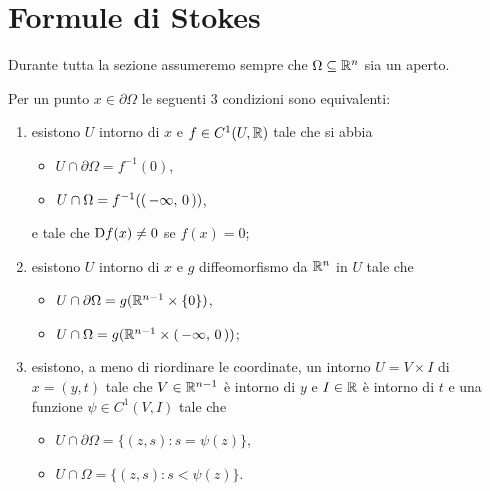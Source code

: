 \section{Formule di Stokes}\label{sezione:FormuleStokes}

Durante tutta la sezione assumeremo sempre che $\Omega\subseteq\mathbb R^n$ sia un aperto.

\begin{theorem}\label{thm:PtRegEquiv}
	Per un punto $x\in \partial \Omega$ le seguenti $3$ condizioni sono equivalenti:
	\begin{enumerate}
		\item esistono $U$ intorno di $x$ e $f\in C^1(U,\mathbb R)$ tale che si abbia
			\begin{itemize}
				\item $U\cap \partial \Omega=f^{-1}(0)$,
				\item $U\cap \Omega=f^{-1}(\left(\,-\infty,\,0\,\right))$,
			\end{itemize}
			e tale che $\mathrm D f(x)\neq 0$ se $f(x)=0$;\label{PRE:i}
		\item esistono $U$ intorno di $x$ e $g$ diffeomorfismo da $\mathbb R^n$ in $U$ tale che\label{PRE:ii}
			\begin{itemize}
				\item $U\cap \partial \Omega = g(\mathbb R^{n-1}\times\{0\})$,
				\item $U\cap \Omega = g(\mathbb R^{n-1}\times\left(\,-\infty,\,0\,\right))$;
			\end{itemize}
		\item esistono, a meno di riordinare le coordinate, un intorno $U=V\times I$ di $x=(y,t)$ tale che $V\in\mathbb R^{n-1}$ è intorno di $y$
			e $I\in\mathbb R$ è intorno di $t$ e una funzione $\psi\in C^1(V,I)$ tale che
			\begin{itemize}
				\item $U\cap \partial \Omega = \{(z,s):s=\psi(z)\}$,
				\item $U\cap \Omega = \{(z,s):s<\psi(z)\}$.
			\end{itemize}\label{PRE:iii}
	\end{enumerate}
\end{theorem}

